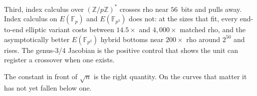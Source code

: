 \documentclass[11pt,a4paper]{article}
\theoremstyle{definition}
\newcommand{\FF}{\mathbb{F}}
\newcommand{\ZZ}{\mathbb{Z}}
\begin{document}
Third, index calculus over $(\ZZ/p\ZZ)^*$ crosses rho near $56$~bits
and pulls away. Index calculus on $E(\FF_p)$ and $E(\FF_{p^3})$ does
not: at the sizes that fit, every end-to-end elliptic variant costs
between $14.5\times$ and $4{,}000\times$ matched rho, and the
asymptotically better $E(\FF_{p^3})$ hybrid bottoms near $200\times$
rho around $2^{50}$ and rises. The genus-3/4 Jacobian is the positive
control that shows the unit can register a crossover when one exists.

The constant in front of $\sqrt{n}$ is the right quantity. On the
curves that matter it has not yet fallen below one.





\end{document}
